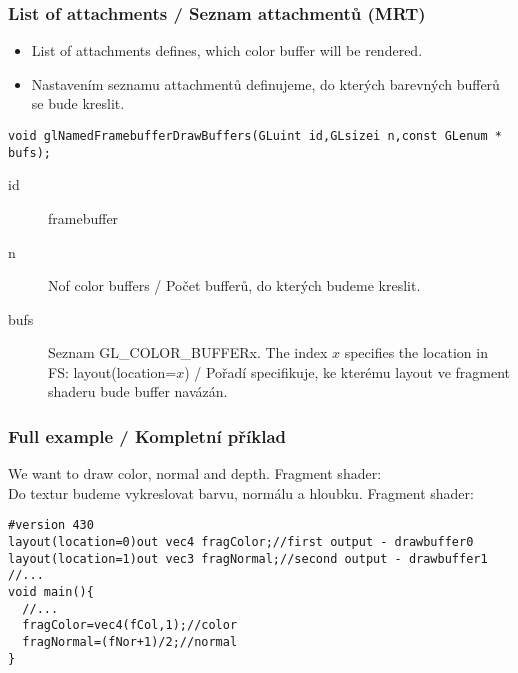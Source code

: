 \begin{frame}[fragile]\frametitle{List of attachments / Seznam attachmentů (MRT)}\scriptsize
\begin{itemize}
  \item List of attachments defines, which color buffer will be rendered.
  \item Nastavením seznamu attachmentů definujeme, do kterých barevných bufferů se bude kreslit.
\end{itemize}

\begin{verbatim}
void glNamedFramebufferDrawBuffers(GLuint id,GLsizei n,const GLenum * bufs);
\end{verbatim}

\begin{description}
  \item[id] framebuffer
  \item[n] Nof color buffers / Počet bufferů, do kterých budeme kreslit.
  \item[bufs] Seznam GL\_COLOR\_BUFFERx.
    The index $x$ specifies the location in FS: layout(location=$x$) / Pořadí specifikuje, ke kterému layout ve fragment shaderu bude buffer navázán.
\end{description}
\end{frame}

\begin{frame}[fragile]\frametitle{Full example / Kompletní příklad}\scriptsize
  We want to draw color, normal and depth. Fragment shader:\\
  Do textur budeme vykreslovat barvu, normálu a hloubku. Fragment shader:

\begin{verbatim}
#version 430
layout(location=0)out vec4 fragColor;//first output - drawbuffer0
layout(location=1)out vec3 fragNormal;//second output - drawbuffer1
//...
void main(){
  //...
  fragColor=vec4(fCol,1);//color
  fragNormal=(fNor+1)/2;//normal
}
\end{verbatim}
\end{frame}

